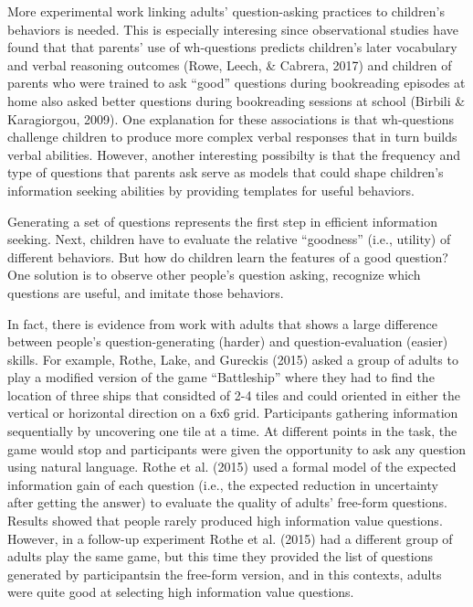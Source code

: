 \documentclass[english,man]{apa6}
\theoremstyle{definition}
\theoremstyle{definition}
\theoremstyle{definition}
\theoremstyle{remark}
\begin{document}
More experimental work linking adults' question-asking practices to
children's behaviors is needed. This is especially interesing since
observational studies have found that that parents' use of wh-questions
predicts children's later vocabulary and verbal reasoning outcomes
(Rowe, Leech, \& Cabrera, 2017) and children of parents who were trained
to ask \enquote{good} questions during bookreading episodes at home also
asked better questions during bookreading sessions at school (Birbili \&
Karagiorgou, 2009). One explanation for these associations is that
wh-questions challenge children to produce more complex verbal responses
that in turn builds verbal abilities. However, another interesting
possibilty is that the frequency and type of questions that parents ask
serve as models that could shape children's information seeking
abilities by providing templates for useful behaviors.

Generating a set of questions represents the first step in efficient
information seeking. Next, children have to evaluate the relative
\enquote{goodness} (i.e., utility) of different behaviors. But how do
children learn the features of a good question? One solution is to
observe other people's question asking, recognize which questions are
useful, and imitate those behaviors.

In fact, there is evidence from work with adults that shows a large
difference between people's question-generating (harder) and
question-evaluation (easier) skills. For example, Rothe, Lake, and
Gureckis (2015) asked a group of adults to play a modified version of
the game \enquote{Battleship} where they had to find the location of
three ships that considted of 2-4 tiles and could oriented in either the
vertical or horizontal direction on a 6x6 grid. Participants gathering
information sequentially by uncovering one tile at a time. At different
points in the task, the game would stop and participants were given the
opportunity to ask any question using natural language. Rothe et al.
(2015) used a formal model of the expected information gain of each
question (i.e., the expected reduction in uncertainty after getting the
answer) to evaluate the quality of adults' free-form questions. Results
showed that people rarely produced high information value questions.
However, in a follow-up experiment Rothe et al. (2015) had a different
group of adults play the same game, but this time they provided the list
of questions generated by participantsin the free-form version, and in
this contexts, adults were quite good at selecting high information
value questions.
\end{document}
